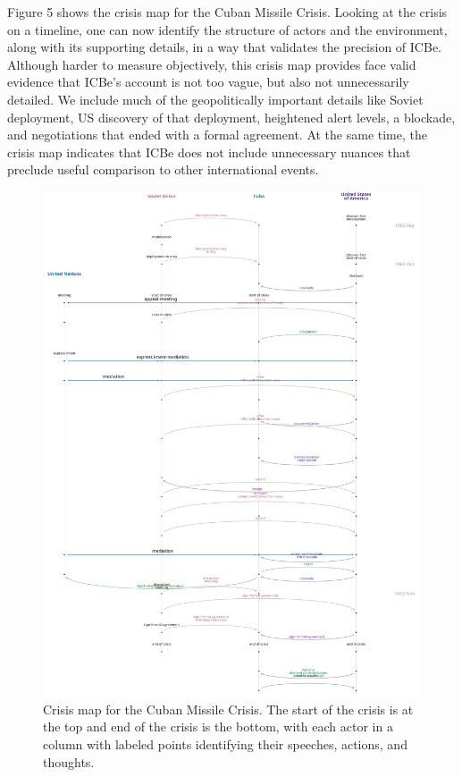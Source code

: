 \documentclass{article}
\begin{document}
Figure 5 shows the crisis map for the Cuban Missile Crisis. Looking at
the crisis on a timeline, one can now identify the structure of actors
and the environment, along with its supporting details, in a way that
validates the precision of ICBe. Although harder to measure objectively,
this crisis map provides face valid evidence that ICBe's account is not
too vague, but also not unnecessarily detailed. We include much of the
geopolitically important details like Soviet deployment, US discovery of
that deployment, heightened alert levels, a blockade, and negotiations
that ended with a formal agreement. At the same time, the crisis map
indicates that ICBe does not include unnecessary nuances that preclude
useful comparison to other international events.

\begin{figure}
\hypertarget{fig-cuba-crisismap}{%
\centering
\includegraphics[width=6in,height=\textheight]{p_196_icbe.png}
\caption{Crisis map for the Cuban Missile Crisis. The start of the
crisis is at the top and end of the crisis is the bottom, with each
actor in a column with labeled points identifying their speeches,
actions, and thoughts.}\label{fig-cuba-crisismap}
}
\end{figure}
\end{document}
